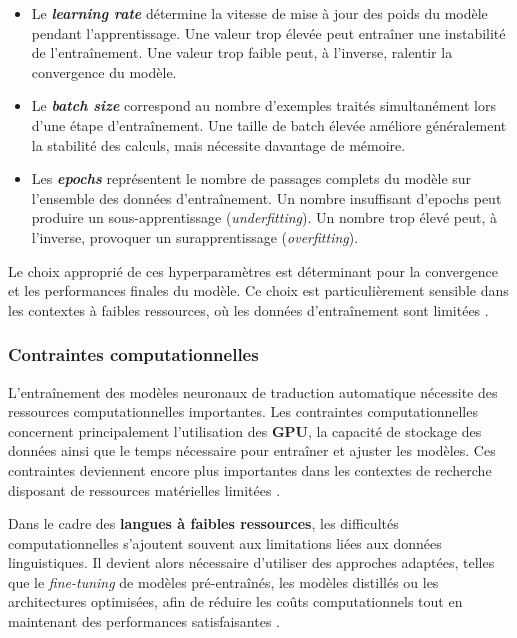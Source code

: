 \begin{itemize}

    \item Le \textbf{\textit{learning rate}} détermine la vitesse de mise à jour des poids du modèle pendant l'apprentissage. Une valeur trop élevée peut entraîner une instabilité de l'entraînement. Une valeur trop faible peut, à l'inverse, ralentir la convergence du modèle.

    \item Le \textbf{\textit{batch size}} correspond au nombre d'exemples traités simultanément lors d'une étape d'entraînement. Une taille de batch élevée améliore généralement la stabilité des calculs, mais nécessite davantage de mémoire.

    \item Les \textbf{\textit{epochs}} représentent le nombre de passages complets du modèle sur l'ensemble des données d'entraînement. Un nombre insuffisant d'epochs peut produire un sous-apprentissage (\textit{underfitting}). Un nombre trop élevé peut, à l'inverse, provoquer un surapprentissage (\textit{overfitting}).

\end{itemize}

Le choix approprié de ces hyperparamètres est déterminant pour la convergence et les performances finales du modèle. Ce choix est particulièrement sensible dans les contextes à faibles ressources, où les données d'entraînement sont limitées \cite{kozhirbayev2024enhancing}.

\subsubsection{Contraintes computationnelles}

L'entraînement des modèles neuronaux de traduction automatique nécessite des ressources computationnelles importantes. Les contraintes computationnelles concernent principalement l'utilisation des \textbf{\ac{GPU}}, la capacité de stockage des données ainsi que le temps nécessaire pour entraîner et ajuster les modèles. Ces contraintes deviennent encore plus importantes dans les contextes de recherche disposant de ressources matérielles limitées \cite{Goodfellow-et-al-2016}.

Dans le cadre des \textbf{langues à faibles ressources}, les difficultés computationnelles s'ajoutent souvent aux limitations liées aux données linguistiques. Il devient alors nécessaire d'utiliser des approches adaptées, telles que le \textit{fine-tuning} de modèles pré-entraînés, les modèles distillés ou les architectures optimisées, afin de réduire les coûts computationnels tout en maintenant des performances satisfaisantes \cite{agyei2025dynamic}.

